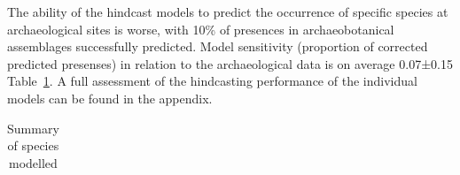 \documentclass[
  authoryear,
  preprint]{elsarticle}
\begin{document}
The ability of the hindcast models to predict the occurrence of specific
species at archaeological sites is worse, with 10\% of presences in
archaeobotanical assemblages successfully predicted. Model sensitivity
(proportion of corrected predicted presenses) in relation to the
archaeological data is on average 0.07±0.15
Table~\ref{tbl-results-summary}. A full assessment of the hindcasting
performance of the individual models can be found in the appendix.

\begingroup
\setlength{}
\setlength{}\fontsize{8.2pt}{9.9pt}\selectfont
\setlength{\LTpost}{0mm}

\begin{longtable}{@{\extracolsep{\fill}}lrrrrrr}

\caption{\label{tbl-results-summary}Summary of species modelled}

\tabularnewline


\end{longtable}
\end{document}

